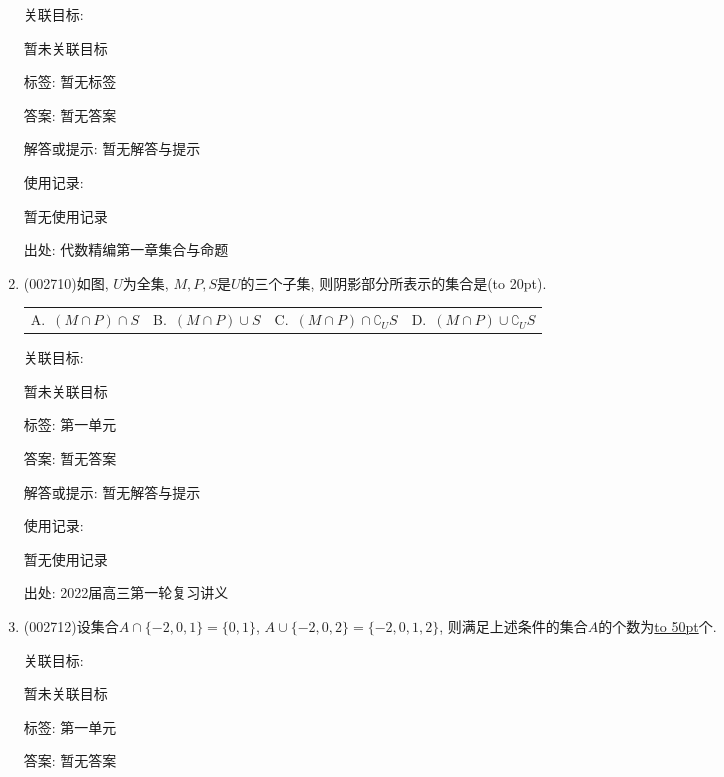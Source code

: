 \documentclass[10pt,a4paper]{article}
\newcommand{\blank}[1]{\underline{\hbox to #1pt{}}}
\newcommand{\bracket}[1]{(\hbox to #1pt{})}
\newcommand{\fourch}[4]{\par\begin{tabular}{p{.23\textwidth}p{.23\textwidth}p{.23\textwidth}p{.23\textwidth}}
A.~#1 &B.~#2& C.~#3& D.~#4
\end{tabular}}
\begin{document}
\begin{enumerate}[1.]
关联目标:

暂未关联目标



标签: 暂无标签

答案: 暂无答案

解答或提示: 暂无解答与提示

使用记录:

暂无使用记录


出处: 代数精编第一章集合与命题
\item { (002710)}如图, $U$为全集, $M,P,S$是$U$的三个子集, 则阴影部分所表示的集合是\bracket{20}.
\fourch{$(M\cap P)\cap S$}{$(M\cap P)\cup S$}{$(M\cap P)\cap \complement_U S$}{$(M\cap P)\cup \complement_U S$}
\begin{center}
\end{center}


关联目标:

暂未关联目标



标签: 第一单元

答案: 暂无答案

解答或提示: 暂无解答与提示

使用记录:

暂无使用记录


出处: 2022届高三第一轮复习讲义
\item { (002712)}设集合$A\cap \{-2,0,1\}=\{0,1\}$, $A\cup \{-2,0,2\}=\{-2,0,1,2\}$, 则满足上述条件的集合$A$的个数为\blank{50}个.


关联目标:

暂未关联目标



标签: 第一单元

答案: 暂无答案


\end{enumerate}
\end{document}

